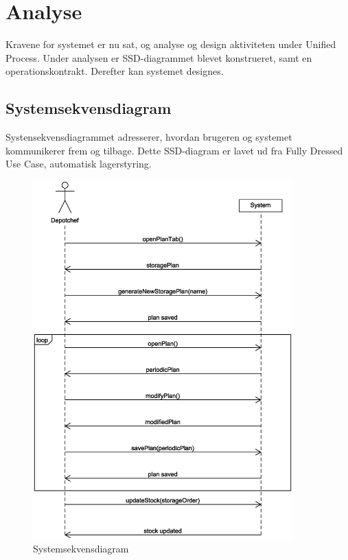 \chapter{Analyse}\label{ch:analyse}

Kravene for systemet er nu sat, og analyse og design aktiviteten under Unified Process\cite{UnifiedProcess}. Under analysen er SSD-diagrammet blevet konstrueret, samt en operationskontrakt. Derefter kan systemet designes. 

\section{Systemsekvensdiagram}
Systensekvensdiagrammet\cite{Larman2004} adresserer, hvordan brugeren og systemet kommunikerer frem og tilbage. Dette SSD-diagram er lavet ud fra Fully Dressed Use Case, automatisk lagerstyring.

\begin{figure}[H]
    \centering
    \includegraphics[width=100mm]{figures/analyse/SSD.eps}
    \caption{Systemsekvensdiagram}
    \label{fig:ssd}
\end{figure}

